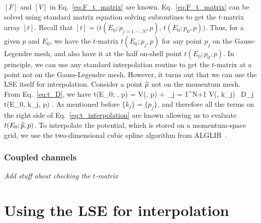   $[F]$ and $[V]$ in Eq.~\eqref{eq:F_t_matrix} are
  known.  Eq.~\eqref{eq:F_t_matrix} can be solved using standard matrix equation
  solving subroutines to get the $t$-matrix array $[t]$.  Recall that
  $\displaystyle {[t] = \big( t(E_0; p_{j = 1,\cdots, N}, p), \, t(E_0; p_0, p)
  \big)}$.  Thus, for a given $p$ and $E_0$, we have the $t$-matrix
  $t(E_0; p_j, p)$ for any point $p_j$ on the Gauss-Legendre mesh, and also
  have it at the half on-shell point $t(E_0; p_0, p)$.  In principle, we can
  use any standard interpolation routine to get the $t$-matrix at a point
  not on the Gauss-Legendre mesh.  However, it turns out that we can use the
  LSE itself for interpolation.  Consider a point $\widetilde{p}$ not on the momentum
  mesh.  From Eq.~\eqref{eq:t_D}, we have
  \beq
  t(E_0; , p) = V(, p) + \sum_{j = 1}^{N+1}
  V(, k_j) \, D_j \, t(E_0, k_j, p) \;.
  \label{eq:t_interpolation}
  \eeq
  As mentioned before $\{k_j\} = \{p_j\}$, and therefore all the terms on the
  right side of Eq.~\eqref{eq:t_interpolation} are known allowing us to
  evaluate $t(E_0; \widetilde{p}, p)$.  To interpolate the potential, which is stored
  on a momentum-space grid, we use
	the two-dimensional cubic spline algorithm from ALGLIB~\cite{ALGLIB:0915}.

  \medskip
  \subsubsection{Coupled channels}

  \emph{Add stuff about checking the $t$-matrix}


  \section{Using the LSE for interpolation}

